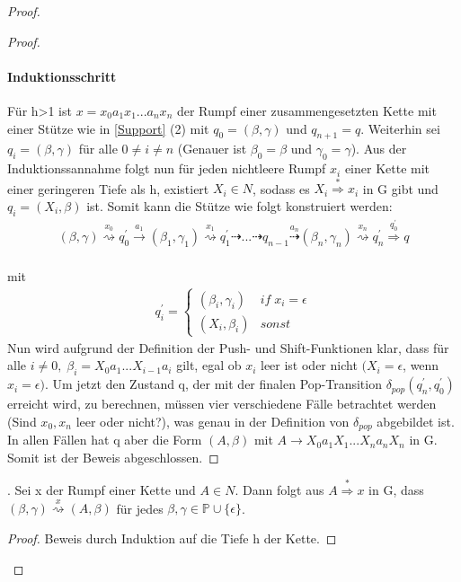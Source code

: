 \begin{proof}
\begin{proof}
\paragraph{Induktionsschritt}
Für h>1 ist $x=x_0a_1x_1...a_nx_n$ der Rumpf einer zusammengesetzten Kette mit einer Stütze wie in \autoref{Support} (2) mit $q_0=(\beta, \gamma)$ und $q_{n+1}=q$. Weiterhin sei $q_i=(\beta, \gamma)$ für alle $0 \neq i \neq n$ (Genauer ist $\beta_0 = \beta$ und $\gamma_0 = \gamma$). Aus der Induktionssannahme folgt nun für jeden nichtleere Rumpf $x_i$ einer Kette mit einer geringeren Tiefe als h, existiert $X_i \in N$, sodass es $X_i \stackrel{*}{\Rightarrow} x_i$ in G gibt und $q_i=(X_i, \beta)$ ist. Somit kann die Stütze wie folgt konstruiert werden:
 \begin{eqnarray*}
(\beta, \gamma) \stackrel{x_0}{\rightsquigarrow} q_0^{\prime} \stackrel{a_1}{\rightarrow} (\beta_1, \gamma_1) \stackrel{x_1}{\rightsquigarrow} q_1^{\prime} \dashrightarrow ... \dashrightarrow q_{n-1} \stackrel{a_n}{\dashrightarrow} (\beta_n, \gamma_n) \stackrel{x_n}{\rightsquigarrow} q_n^{\prime} \stackrel {q_0^{\prime}} {\Rightarrow} q
\end{eqnarray*}\\
mit 
\begin{eqnarray*}
q_i^\prime = \begin{cases}
(\beta_i, \gamma_i) & if \; x_i = \epsilon \\
(X_i, \beta_i) & sonst
\end{cases}
\end{eqnarray*}
Nun wird aufgrund der Definition der Push- und Shift-Funktionen klar, dass für alle $i \neq 0,\; \beta_i = X_0a_1...X_{i-1}a_i$ gilt, egal ob $x_i$ leer ist oder nicht $(X_i=\epsilon$, wenn $x_i=\epsilon)$. Um jetzt den Zustand q, der mit der finalen Pop-Transition $\delta_{pop}(q_n^\prime, q_0^\prime)$ erreicht wird, zu berechnen, müssen vier verschiedene Fälle betrachtet werden (Sind $x_0, x_n$ leer oder nicht?), was genau in der Definition von $\delta_{pop}$ abgebildet ist. In allen Fällen hat q aber die Form $(A, \beta)$ mit $A \rightarrow X_0a_1X_1...X_na_nX_n$ in G.\\
 Somit ist der Beweis abgeschlossen.
\end{proof}

\begin{lemma}.
Sei x der Rumpf einer Kette und $A \in N$. Dann folgt aus $A \stackrel{*}{\Rightarrow} x$ in G, dass $(\beta, \gamma) \stackrel{x}{\rightsquigarrow}(A, \beta)$ für jedes $\beta, \gamma \in \mathbb{P} \cup \{\epsilon\}$.
\end{lemma}
\begin{proof}
Beweis durch Induktion auf die Tiefe h der Kette. 

\end{proof}
\end{proof}
